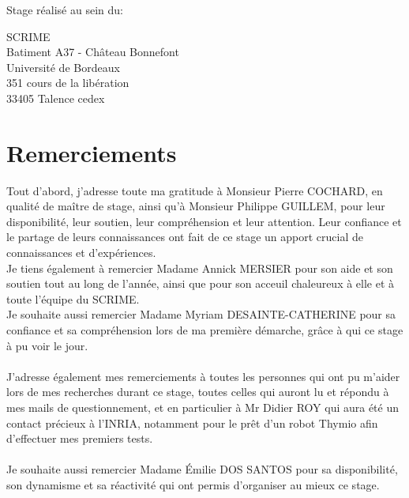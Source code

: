 \documentclass[a4paper, 12pt]{report}
\begin{document}
\begin{titlepage}
\vspace{1cm}
Stage réalisé au sein du:
\begin{multicols}{2}
\begin{center}
SCRIME\\
Batiment A37 - Château Bonnefont\\
Université de Bordeaux\\
351 cours de la libération\\
33405 Talence cedex
\end{center}
\columnbreak
\begin{center}

\vspace{0.4cm}
\end{center}
\end{multicols}



\end{titlepage}


\chapter*{Remerciements}

Tout d'abord, j'adresse toute ma gratitude à Monsieur Pierre COCHARD, en qualité de maître de stage, ainsi qu'à Monsieur Philippe GUILLEM, pour leur disponibilité, leur soutien, leur compréhension et leur attention. Leur confiance et le partage de leurs connaissances ont fait de ce stage un apport crucial de connaissances et d'expériences.\\

Je tiens également à remercier Madame Annick MERSIER pour son aide et son soutien tout au long de l'année, ainsi que pour son acceuil chaleureux à elle et à toute l'équipe du SCRIME.\\
Je souhaite aussi remercier Madame Myriam DESAINTE-CATHERINE pour sa confiance et sa compréhension lors de ma première démarche, grâce à qui ce stage à pu voir le jour.\\\\
J'adresse également mes remerciements à toutes les personnes qui ont pu m'aider lors de mes recherches durant ce stage, toutes celles qui auront lu et répondu à mes mails de questionnement, et en particulier à Mr Didier ROY qui aura été un contact précieux à l'INRIA, notamment pour le prêt d'un robot Thymio afin d'effectuer mes premiers tests.\\\\
Je souhaite aussi remercier Madame Émilie DOS SANTOS pour sa disponibilité, son dynamisme et sa réactivité qui ont permis d'organiser au mieux ce stage.\\
\end{document}
